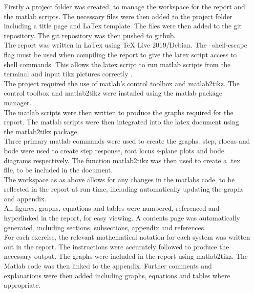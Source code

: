 \documentclass[12pt]{article}
\begin{document}
Firstly a project folder was created, to manage the workspace for the report and the matlab scripts. The necessary files were then added to the project folder including a title page and LaTex template. The files were then added to the git repository. The git repository was then pushed to github.\\

The report was written in LaTex using TeX Live 2019/Debian. The --shell-escape flag must be used when compiling the report to give the latex script access to shell commands. This allows the latex script to run matlab scripts from the terminal and input tikz pictures correctly .\\ 

The project required the use of matlab's control toolbox and matlab2tikz. The control toolbox and matlab2tikz were installed using the matlab package manager.\\

The matlab scripts were then written to produce the graphs required for the report. The matlab scripts were then integrated into the latex document using the matlab2tikz package.\\

Three primary matlab commands were used to create the graphs. step, rlocus and bode were used to create step response, root locus s-plane plots and bode diagrams respectively. The function matlab2tikz was then used to create a .tex file, to be included in the document.\\

The workspace as as above allows for any changes in the matlabs code, to be reflected in the report at run time, including automatically updating the graphs and appendix.\\

All figures, graphs, equations and tables were numbered, referenced and hyperlinked in the report, for easy viewing. A contents page was automatically generated, including sections, subsections, appendix and references.\\

For each exercise, the relevant mathematical notation for each system was written out in the report. The instructions were accurately followed to produce the necessary output. The graphs were included in the report using matlab2tikz. The Matlab code was then linked to the appendix. Further comments and explanations were then added including graphs, equations and tables where appropriate. \\
\end{document}
